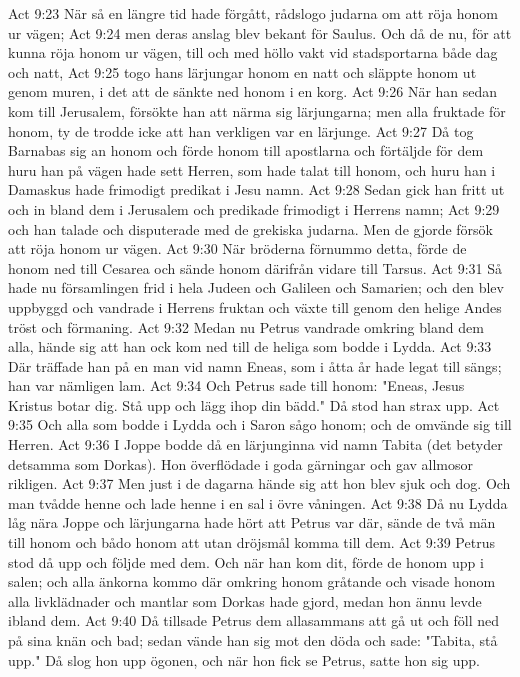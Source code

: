 Act 9:23  När så en längre tid hade förgått, rådslogo judarna om att röja honom ur vägen;
Act 9:24  men deras anslag blev bekant för Saulus. Och då de nu, för att kunna röja honom ur vägen, till och med höllo vakt vid stadsportarna både dag och natt,
Act 9:25  togo hans lärjungar honom en natt och släppte honom ut genom muren, i det att de sänkte ned honom i en korg.
Act 9:26  När han sedan kom till Jerusalem, försökte han att närma sig lärjungarna; men alla fruktade för honom, ty de trodde icke att han verkligen var en lärjunge.
Act 9:27  Då tog Barnabas sig an honom och förde honom till apostlarna och förtäljde för dem huru han på vägen hade sett Herren, som hade talat till honom, och huru han i Damaskus hade frimodigt predikat i Jesu namn.
Act 9:28  Sedan gick han fritt ut och in bland dem i Jerusalem och predikade frimodigt i Herrens namn;
Act 9:29  och han talade och disputerade med de grekiska judarna. Men de gjorde försök att röja honom ur vägen.
Act 9:30  När bröderna förnummo detta, förde de honom ned till Cesarea och sände honom därifrån vidare till Tarsus.
Act 9:31  Så hade nu församlingen frid i hela Judeen och Galileen och Samarien; och den blev uppbyggd och vandrade i Herrens fruktan och växte till genom den helige Andes tröst och förmaning.
Act 9:32  Medan nu Petrus vandrade omkring bland dem alla, hände sig att han ock kom ned till de heliga som bodde i Lydda.
Act 9:33  Där träffade han på en man vid namn Eneas, som i åtta år hade legat till sängs; han var nämligen lam.
Act 9:34  Och Petrus sade till honom: "Eneas, Jesus Kristus botar dig. Stå upp och lägg ihop din bädd." Då stod han strax upp.
Act 9:35  Och alla som bodde i Lydda och i Saron sågo honom; och de omvände sig till Herren.
Act 9:36  I Joppe bodde då en lärjunginna vid namn Tabita (det betyder detsamma som Dorkas). Hon överflödade i goda gärningar och gav allmosor rikligen.
Act 9:37  Men just i de dagarna hände sig att hon blev sjuk och dog. Och man tvådde henne och lade henne i en sal i övre våningen.
Act 9:38  Då nu Lydda låg nära Joppe och lärjungarna hade hört att Petrus var där, sände de två män till honom och bådo honom att utan dröjsmål komma till dem.
Act 9:39  Petrus stod då upp och följde med dem. Och när han kom dit, förde de honom upp i salen; och alla änkorna kommo där omkring honom gråtande och visade honom alla livklädnader och mantlar som Dorkas hade gjord, medan hon ännu levde ibland dem.
Act 9:40  Då tillsade Petrus dem allasammans att gå ut och föll ned på sina knän och bad; sedan vände han sig mot den döda och sade: "Tabita, stå upp." Då slog hon upp ögonen, och när hon fick se Petrus, satte hon sig upp.
